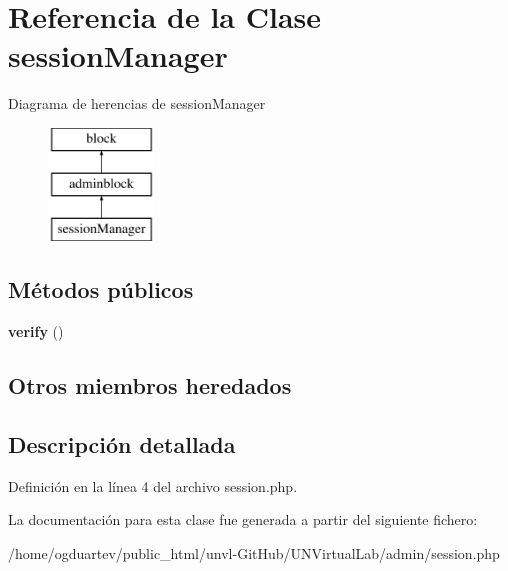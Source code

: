 \hypertarget{classsessionManager}{}\section{Referencia de la Clase session\+Manager}
\label{classsessionManager}
Diagrama de herencias de session\+Manager\begin{figure}[H]
\begin{center}
\leavevmode
\includegraphics[height=3.000000cm]{classsessionManager}
\end{center}
\end{figure}
\subsection*{Métodos públicos}
\begin{DoxyCompactItemize}
\item 
\mbox{\label{classsessionManager_a341e75413ef5e07e6d59f49e7b1845db}} 
{\bfseries verify} ()
\end{DoxyCompactItemize}
\subsection*{Otros miembros heredados}


\subsection{Descripción detallada}


Definición en la línea 4 del archivo session.\+php.



La documentación para esta clase fue generada a partir del siguiente fichero\+:\begin{DoxyCompactItemize}
\item 
/home/ogduartev/public\+\_\+html/unvl-\/\+Git\+Hub/\+U\+N\+Virtual\+Lab/admin/session.\+php\end{DoxyCompactItemize}
